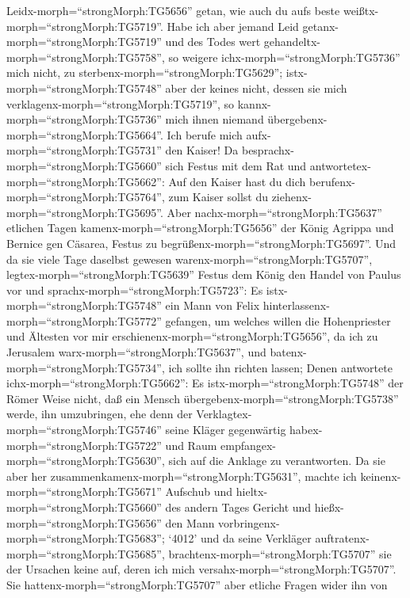 Leidx-morph=``strongMorph:TG5656'' getan, wie auch du aufs beste
weißtx-morph=``strongMorph:TG5719''.  Habe ich aber jemand
Leid getanx-morph=``strongMorph:TG5719'' und des Todes wert
gehandeltx-morph=``strongMorph:TG5758'', so weigere
ichx-morph=``strongMorph:TG5736'' mich nicht, zu
sterbenx-morph=``strongMorph:TG5629''; istx-morph=``strongMorph:TG5748''
aber der keines nicht, dessen sie mich
verklagenx-morph=``strongMorph:TG5719'', so
kannx-morph=``strongMorph:TG5736'' mich ihnen niemand
übergebenx-morph=``strongMorph:TG5664''. Ich berufe mich
aufx-morph=``strongMorph:TG5731'' den Kaiser!  Da
besprachx-morph=``strongMorph:TG5660'' sich Festus mit dem Rat und
antwortetex-morph=``strongMorph:TG5662'': Auf den Kaiser hast du dich
berufenx-morph=``strongMorph:TG5764'', zum Kaiser sollst du
ziehenx-morph=``strongMorph:TG5695''.  Aber
nachx-morph=``strongMorph:TG5637'' etlichen Tagen
kamenx-morph=``strongMorph:TG5656'' der König Agrippa und Bernice gen
Cäsarea, Festus zu begrüßenx-morph=``strongMorph:TG5697''. 
Und da sie viele Tage daselbst gewesen
warenx-morph=``strongMorph:TG5707'', legtex-morph=``strongMorph:TG5639''
Festus dem König den Handel von Paulus vor und
sprachx-morph=``strongMorph:TG5723'': Es
istx-morph=``strongMorph:TG5748'' ein Mann von Felix
hinterlassenx-morph=``strongMorph:TG5772'' gefangen,  um
welches willen die Hohenpriester und Ältesten vor mir
erschienenx-morph=``strongMorph:TG5656'', da ich zu Jerusalem
warx-morph=``strongMorph:TG5637'', und
batenx-morph=``strongMorph:TG5734'', ich sollte ihn richten lassen;
 Denen antwortete ichx-morph=``strongMorph:TG5662'': Es
istx-morph=``strongMorph:TG5748'' der Römer Weise nicht, daß ein Mensch
übergebenx-morph=``strongMorph:TG5738'' werde, ihn umzubringen, ehe denn
der Verklagtex-morph=``strongMorph:TG5746'' seine Kläger gegenwärtig
habex-morph=``strongMorph:TG5722'' und Raum
empfangex-morph=``strongMorph:TG5630'', sich auf die Anklage zu
verantworten.  Da sie aber her
zusammenkamenx-morph=``strongMorph:TG5631'', machte ich
keinenx-morph=``strongMorph:TG5671'' Aufschub und
hieltx-morph=``strongMorph:TG5660'' des andern Tages Gericht und
hießx-morph=``strongMorph:TG5656'' den Mann
vorbringenx-morph=``strongMorph:TG5683'';  `4012' und da
seine Verkläger auftratenx-morph=``strongMorph:TG5685'',
brachtenx-morph=``strongMorph:TG5707'' sie der Ursachen keine auf, deren
ich mich versahx-morph=``strongMorph:TG5707''.  Sie
hattenx-morph=``strongMorph:TG5707'' aber etliche Fragen wider ihn von
